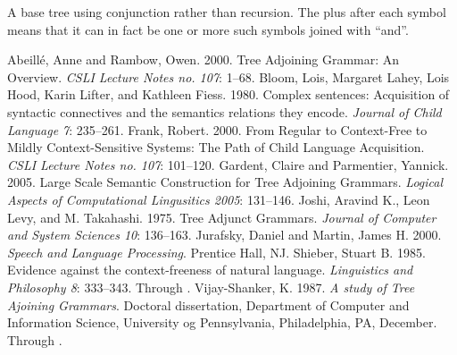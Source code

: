 \documentclass[12pt]{article}
\begin{document}
\begin{Figure}
\begin{center}
\end{center}
\caption{A base tree using conjunction rather than recursion.  The plus
after each symbol means that it can in fact be one or more such symbols
joined with ``and''.}
\label{conjunction}
\end{Figure}


\clearpage

\singlespace
\begin{thebibliography}{4in}
 Abeill\'e, Anne and Rambow, Owen.  2000.  Tree
Adjoining Grammar: An Overview.  \textit{CSLI Lecture Notes no. 107}:
1--68.
 Bloom, Lois, Margaret Lahey, Lois Hood, Karin
Lifter, and Kathleen Fiess.  1980.  Complex sentences: Acquisition of
syntactic connectives and the semantics relations they encode.
\textit{Journal of Child Language 7}: 235--261.
 Frank, Robert.  2000.  From Regular to Context-Free
to Mildly Context-Sensitive Systems: The Path of Child Language
Acquisition.  \textit{CSLI Lecture Notes no. 107}: 101--120.
 Gardent, Claire and Parmentier, Yannick.  2005.
Large Scale Semantic Construction for Tree Adjoining Grammars.
\textit{Logical Aspects of Computational Lingusitics 2005}: 131--146.
 Joshi, Aravind K., Leon Levy, and M. Takahashi.
1975. Tree Adjunct Grammars. \textit{Journal of Computer and System
Sciences 10}: 136--163.
 Jurafsky, Daniel and Martin, James H. 2000.
\textit{Speech and Language Processing}.  Prentice Hall, NJ.
 Shieber, Stuart B.  1985. Evidence against the
context-freeness of natural language.  \textit{Linguistics and
Philosophy 8}: 333--343.  Through \cite{Abeille-2000}.
 Vijay-Shanker, K. 1987.  \textit{A study of
Tree Ajoining Grammars}.  Doctoral dissertation, Department of Computer
and Information Science, University og Pennsylvania, Philadelphia, PA,
December.  Through \cite{Abeille-2000}.
\end{thebibliography}
\end{document}
